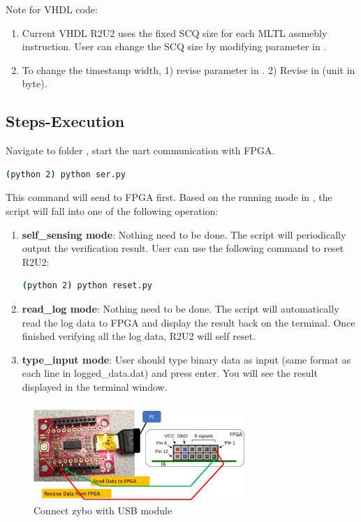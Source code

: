 Note for VHDL code:
\begin{enumerate}
\item Current VHDL R2U2 uses the fixed SCQ size for each MLTL assmebly instruction. User can change the SCQ size by modifying parameter  in .
\item To change the timestamp width, 1) revise parameter  in . 2) Revise  in  (unit in byte). 
\end{enumerate}


\subsection{Steps-Execution}
Navigate to folder , start the uart communication with FPGA.
\begin{lstlisting}[language=Bash]
(python 2) python ser.py
\end{lstlisting}
This command will send  to FPGA first. Based on the running mode in , the script will fall into one of the following operation:
\begin{enumerate}
	\item \textbf{self\_sensing mode}:
	Nothing need to be done. The script will periodically output the verification result. User can use the following command to reset R2U2:
	\begin{lstlisting}[language=Bash]
(python 2) python reset.py
	\end{lstlisting}
	\item \textbf{read\_log mode}:
	Nothing need to be done. The script will automatically read the  log data to FPGA and display the result back on the terminal. Once finished verifying all the log data, R2U2 will self reset.
	\item \textbf{type\_input mode}:
	User should type binary data as input (same format as each line in \textcolor{purple!30}{logged\_data.dat}) and press enter. You will see the result displayed in the terminal window.
\end{enumerate}

\subsubsection{}
\begin{figure}[h]
	\caption{Connect zybo with USB module}
	\label{connect_fpga_use}
	\includegraphics[width=8cm]{./fig/connection_zybo.pdf}
	\centering
	\end{figure}



